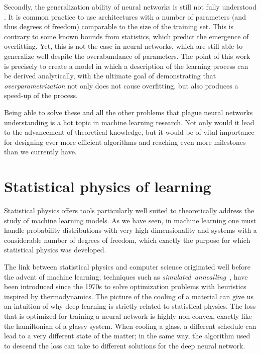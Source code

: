 Secondly, the generalization ability of neural networks is still not fully understood \cite{zhang2021understanding}.
It is common practice to use architectures with a number of parameters (and thus degrees of freedom) comparable to the size of the training set. This is contrary to some known bounds from statistics, which predict the emergence of overfitting. Yet, this is not the case in neural networks, which are still able to generalize well despite the overabundance of parameters.
The point of this work is precisely to create a model in which a description of the learning process can be derived analytically, with the ultimate goal of demonstrating that \emph{overparametrization} not only does not cause overfitting, but also produces a speed-up of the process.

Being able to solve these and all the other problems that plague neural networks understanding is a hot topic in machine learning research. Not only would it lead to the advancement of theoretical knowledge, but it would be of vital importance for designing ever more efficient algorithms and reaching even more milestones than we currently have.

\section{Statistical physics of learning}
Statistical physics offers tools particularly well suited to theoretically address the study of machine learning models.
As we have seen, in machine learning one must handle probability distributions with very high dimensionality and systems with a considerable number of degrees of freedom,
which exactly the purpose for which statistical physics was developed.

The link between statistical physics and computer science originated well before the advent of machine learning;
techniques such as \emph{simulated~annealling}~\cite{kirkpatrick1983optimization},
have been introduced since the 1970s to solve optimization problems with heuristics inspired by thermodynamics.
The picture of the cooling of a material can give us an intuition of why deep learning is strictly related to statistical physics.
The loss that is optimized for training a neural network is highly non-convex, exactly like the hamiltonian of a glassy system.
When cooling a glass, a different schedule can lead to a very different state of the matter;
in the same way, the algorithm used to descend the loss can take to different solutions for the deep neural network.

